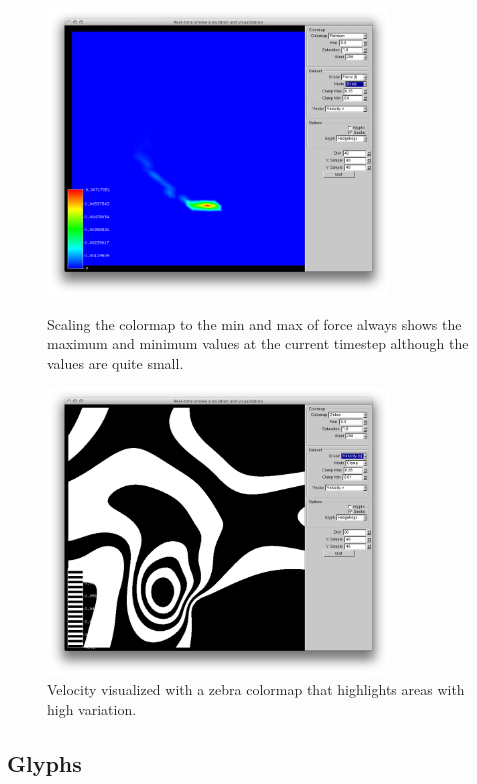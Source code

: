 \begin{figure}[htbp]
\centering
\begin{minipage}[t]{0.48\textwidth}
        \includegraphics[height=3in]{figures/colormaps/forceScaled.png}
\caption{Scaling the colormap to the min and max of force always shows the maximum and minimum values at the current timestep although the values are quite small.}
\label{fig:forceScaled}
\end{minipage}\hspace{.04\textwidth}%
\begin{minipage}[t]{0.48\textwidth}
        \includegraphics[height=3in]{figures/colormaps/velocityZebra.png}
    \caption{Velocity visualized with a zebra colormap that highlights areas with high variation.}
    \label{fig:velocityZebra}
\end{minipage}
\end{figure}


\subsection{Glyphs}


